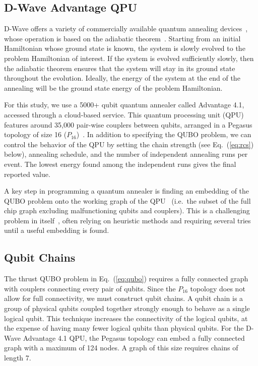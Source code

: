 \documentclass[aps,prd,twocolumn,superscriptaddress,preprintnumbers,nofootinbib,longbibliography,floatfix]{revtex4-1}
\DeclareRobustCommand{\Eq}[1]{Eq.~(\ref{eq:#1})}
\begin{document}
\subsection{D-Wave Advantage QPU}
\label{sec:advantage_qpu}

D-Wave offers a variety of commercially available quantum annealing devices~\cite{Dwave-QPU}, whose operation is based on the adiabatic theorem~\cite{Born1928}.
%
Starting from an initial Hamiltonian whose ground state is known, the system is slowly evolved to the problem Hamiltonian of interest.
%
If the system is evolved sufficiently slowly, then the adiabatic theorem ensures that the system will stay in its ground state throughout the evolution.
%
Ideally, the energy of the system at the end of the  annealing will be the ground state energy of the problem Hamiltonian.


For this study, we use a 5000+ qubit quantum annealer called Advantage 4.1, accessed through a cloud-based service.
%
This quantum processing unit (QPU) features around 35,000 pair-wise couplers between qubits, arranged in a Pegasus topology of size 16 ($P_{16}$)~\cite{Dwave-QPU}.
%
In addition to specifying the QUBO problem, we can control the behavior of the QPU by setting the chain strength (see \Eq{rcs} below), annealing schedule, and the number of independent annealing runs per event.
%
The lowest energy found among the independent runs gives the final reported value.


A key step in programming a quantum annealer is finding an embedding of the QUBO problem onto the working graph of the QPU~\cite{choi2008minorembedding} (i.e.~the subset of the full chip graph excluding malfunctioning qubits and couplers).
%
This is a challenging problem in itself~\cite{choi2008minorembedding, Okada_2019}, often relying on heuristic methods and requiring several tries until a useful embedding is found.


\subsection{Qubit Chains}

The thrust QUBO problem in \Eq{qubo} requires a fully connected graph with couplers connecting every pair of qubits.
%
Since the $P_{16}$ topology does not allow for full connectivity, we must construct qubit chains.
%
A qubit chain is a group of physical qubits coupled together strongly enough to behave as a single logical qubit.
%
This technique increases the connectivity of the logical qubits, at the expense of having many fewer logical qubits than physical qubits.
%
For the D-Wave Advantage 4.1 QPU, the Pegasus topology can embed a fully connected graph with a maximum of 124 nodes.
%
A graph of this size requires chains of length 7.
\end{document}
